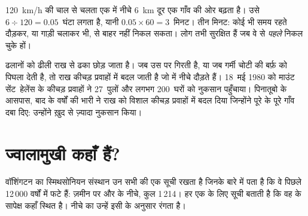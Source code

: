 \begin{example}[पायरोक्लास्टिक प्रवाह से दौड़]\label{ex:g7:volcanoes:race}
\qty{120}{km/h} की चाल से चलता एक   में नीचे
\qty{6}{km} दूर एक गाँव की ओर बढ़ता है। उसे $6 \div 120 = 0.05$~घंटा लगता है,
यानी $0.05 \times 60 = 3$~मिनट। तीन मिनट: कोई भी समय रहते दौड़कर, या गाड़ी
चलाकर भी,  से बाहर नहीं निकल सकता। लोग तभी सुरक्षित हैं जब वे  से
\emph{पहले} निकल चुके हों।
\end{example}

\begin{remark}[कीचड़ प्रवाह: बाद में आने वाला ख़तरा]\label{rem:g7:volcanoes:mudflows}
 ढलानों को ढीली राख से ढका छोड़ जाता है। जब उस पर  गिरती है, या जब
गर्मी चोटी की बर्फ़ को पिघला देती है, तो राख कीचड़ प्रवाहों में बदल जाती है जो
 में नीचे दौड़ते हैं। 18~मई 1980 को माउंट सेंट~हेलेंस के कीचड़ प्रवाहों ने
27~पुलों और लगभग 200~घरों को नुकसान पहुँचाया। पिनातूबो के आसपास, बाद के वर्षों
की भारी  ने राख को विशाल कीचड़ प्रवाहों में बदल दिया जिन्होंने पूरे के
पूरे गाँव दबा दिए: उन्होंने ख़ुद  से ज़्यादा नुकसान
किया।
\end{remark}


\section{ज्वालामुखी कहाँ हैं?}

वॉशिंगटन का स्मिथसोनियन संस्थान उन सभी  की एक सूची रखता है जिनके
बारे में पता है कि वे पिछले 12\,000 वर्षों में फटे हैं: ज़मीन पर और  के
नीचे, कुल 1\,214। हर एक के लिए सूची बताती है कि वह  के सापेक्ष कहाँ
स्थित है। नीचे का  उन्हें इसी के अनुसार रंगता है।

